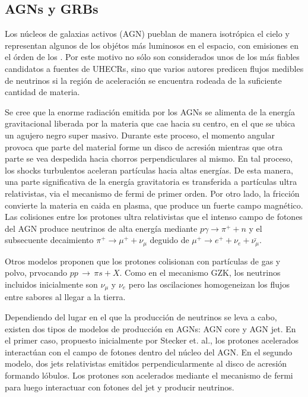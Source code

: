 	\subsection{AGNs y GRBs}
	Los n\'ucleos de galaxias activos (AGN) pueblan de manera isotr\'opica el cielo y representan algunos de los obj\'etos m\'as luminosos en el espacio, con emisiones en el \'orden de los \cite{cite:GHZ}.
	Por este motivo no s\'olo son considerados unos de los m\'as fiables candidatos a fuentes de UHECRs, sino que varios autores predicen flujos medibles de neutrinos si la regi\'on de aceleraci\'on se encuentra rodeada de la suficiente cantidad de materia.
	
	Se cree que la enorme radiaci\'on emitida por los AGNs se alimenta de la energ\'ia gravitacional liberada por la materia que cae hacia su centro, en el que se ubica un agujero negro super masivo.
	Durante este proceso, el momento angular provoca que parte del material forme un disco de acresi\'on mientras que otra parte se vea despedida hacia chorros perpendiculares al mismo.
	En tal proceso, los shocks turbulentos aceleran part\'iculas hacia altas energ\'ias.
	De esta manera, una parte significativa de la energ\'ia gravitatoria es transferida a part\'iculas ultra relativistas, via el mecanismo de fermi de primer orden\cite{cite:Fermi1}.
	Por otro lado, la fricci\'on convierte la materia en caida en plasma, que produce un fuerte campo magn\'etico.
	Las colisiones entre los protones ultra relativistas que el intenso campo de fotones del AGN produce neutrinos de alta energ\'ia mediante $p\gamma \rightarrow \pi^{+} + n$ y el subsecuente decaimiento $\pi^{+} \rightarrow \mu^{+} + \nu_{\mu}$ deguido de $\mu^{+} \rightarrow e^{+} + \nu_{e} + \bar{\nu_{\mu}}$.
	
	Otros modelos proponen que los protones colisionan con part\'iculas de gas y polvo, prvocando $pp\,\rightarrow\,\pi s + X$.
	Como en el mecanismo GZK, los neutrinos incluidos inicialmente son $\nu_\mu$ y $\nu_e$ pero las oscilaciones homogeneizan los flujos entre sabores al llegar a la tierra.
	
	Dependiendo del lugar en el que la producci\'on de neutrinos se leva a cabo, existen dos tipos de modelos de producci\'on en AGNs: AGN core y AGN jet.
	En el primer caso, propuesto inicialmente por Stecker et. al.\cite{cite:nuAGN}, los protones acelerados interact\'uan con el campo de fotones dentro del n\'ucleo del AGN. 
	En el segundo modelo, dos jets relativistas emitidos perpendicularmente al disco de acresi\'on formando l\'obulos. 
	Los protones son acelerados mediante el mecanismo de fermi para luego interactuar con fotones del jet y producir neutrinos.
	
